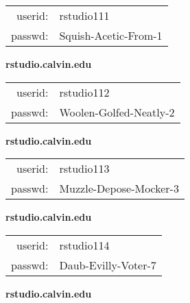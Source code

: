 \documentclass{article}\usepackage[]{graphicx}\usepackage[]{color}
\begin{document}
\begin{multicols}{3}
\begin{minipage}{.3\textwidth}
\begin{tabular}{rl}
userid: & rstudio111\\
passwd: & Squish-Acetic-From-1

\vspace{5mm}

\end{tabular}\end{minipage}

\vspace{5mm}

\begin{minipage}{.3\textwidth}
\centerline{\textbf{rstudio.calvin.edu}}
\medskip
\begin{tabular}{rl}

userid: & rstudio112\\
passwd: & Woolen-Golfed-Neatly-2

\vspace{5mm}

\end{tabular}\end{minipage}

\vspace{5mm}

\begin{minipage}{.3\textwidth}
\centerline{\textbf{rstudio.calvin.edu}}
\medskip
\begin{tabular}{rl}

userid: & rstudio113\\
passwd: & Muzzle-Depose-Mocker-3

\vspace{5mm}

\end{tabular}\end{minipage}

\vspace{5mm}

\begin{minipage}{.3\textwidth}
\centerline{\textbf{rstudio.calvin.edu}}
\medskip
\begin{tabular}{rl}

userid: & rstudio114\\
passwd: & Daub-Evilly-Voter-7

\vspace{5mm}

\end{tabular}\end{minipage}

\vspace{5mm}

\begin{minipage}{.3\textwidth}
\centerline{\textbf{rstudio.calvin.edu}}
\medskip
\begin{tabular}{rl}


\end{tabular}
\end{minipage}
\end{multicols}
\end{document}

